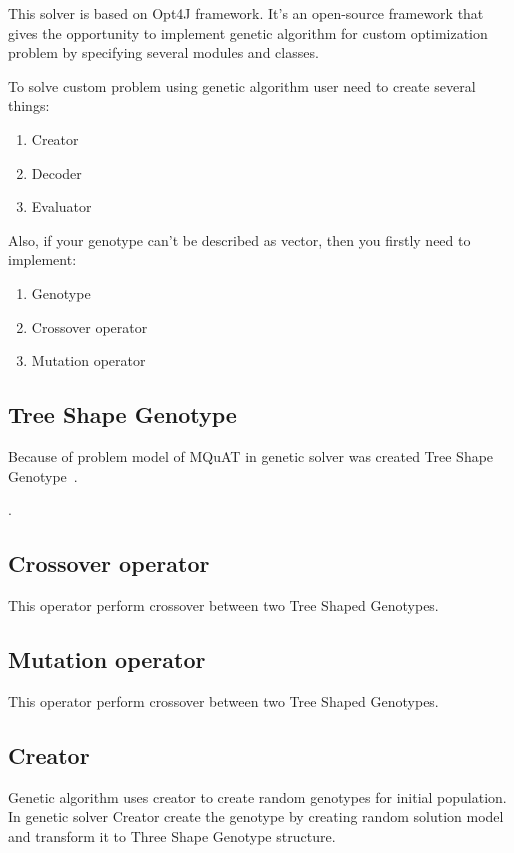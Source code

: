 This solver is based on Opt4J framework. It's an open-source framework that gives the opportunity to implement genetic algorithm for custom optimization problem by specifying several modules and classes.

To solve custom problem using genetic algorithm user need to create several things:
\begin{enumerate}
	\item Creator
	\item Decoder
	\item Evaluator
\end{enumerate}
Also, if your genotype can't be described as vector, then you firstly need to implement:
\begin{enumerate}
	\item Genotype
	\item Crossover operator
	\item Mutation operator
\end{enumerate}

\subsection{Tree Shape Genotype}
Because of problem model of MQuAT in genetic solver was created Tree Shape Genotype~\cite{ahmad18}.

.
 
\subsection{Crossover operator}
This operator perform crossover between two Tree Shaped Genotypes. 




\subsection{Mutation operator}
This operator perform crossover between two Tree Shaped Genotypes. 


\subsection{Creator}
\label{subsec:Creator}
Genetic algorithm uses creator to create random genotypes for initial population.
In genetic solver Creator create the genotype by creating random solution model and transform it to Three Shape Genotype structure.

